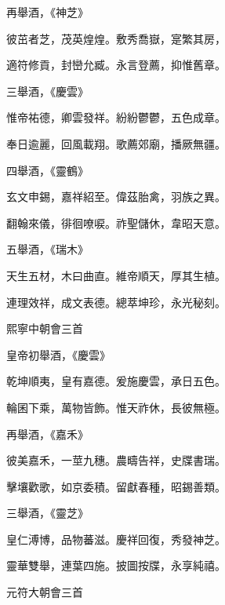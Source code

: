 \begin{pinyinscope}
 再舉酒，《神芝》



 彼茁者芝，茂英煌煌。敷秀喬嶽，寔繁其房，



 適符修貢，封巒允臧。永言登薦，抑惟舊章。



 三舉酒，《慶雲》



 惟帝祐德，卿雲發祥。紛紛鬱鬱，五色成章。



 奉日逾麗，回風載翔。歌薦郊廟，播厥無疆。



 四舉酒，《靈鶴》



 玄文申錫，嘉祥紹至。偉茲胎禽，羽族之異。



 翻翰來儀，徘徊嘹唳。祚聖儲休，韋昭天意。



 五舉酒，《瑞木》



 天生五材，木曰曲直。維帝順天，厚其生植。



 連理效祥，成文表德。總萃坤珍，永光秘刻。



 熙寧中朝會三首



 皇帝初舉酒，《慶雲》



 乾坤順夷，皇有嘉德。爰施慶雲，承日五色。



 輪囷下乘，萬物皆飾。惟天祚休，長彼無極。



 再舉酒，《嘉禾》



 彼美嘉禾，一莖九穗。農疇告祥，史牒書瑞。



 擊壤歡歌，如京委積。留獻春種，昭錫善類。



 三舉酒，《靈芝》



 皇仁溥博，品物蕃滋。慶祥回復，秀發神芝。



 靈華雙舉，連葉四施。披圖按牒，永享純禧。



 元符大朝會三首




\end{pinyinscope}

